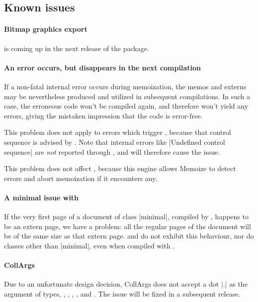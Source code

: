 \documentclass[a4paper,11pt]{article}
\begin{document}
\subsection{Known issues}
\label{sec:known-issues}

\paragraph*{Bitmap graphics export} is coming up in the next release of the
package.


\paragraph{An error occurs, but disappears in the next compilation}
If a non-fatal internal  error occurs during memoization, the memos
and externs may be nevertheless produced and utilized in subsequent
compilations.  In such a case, the erroneous code won't be compiled again, and
therefore won't yield any errors, giving the mistaken impression that the code
is error-free.

This problem does not apply to errors which trigger ,
because that control sequence is advised by .
Note that internal  errors like |Undefined control sequence| are
\emph{not} reported through , and will therefore cause the
issue.

This problem does not affect , because this engine allows
Memoize to detect errors and abort memoization if it encounters any.


\paragraph{A minimal issue with }
If the very first page of a document of class |minimal|, compiled by
, happens to be an extern page, we have a problem: all the
regular pages of the document will be of the same size as that extern page.
 and  do not exhibit this behaviour, nor do
 classes other than |minimal|, even when compiled with
.


\paragraph{CollArgs}

Due to an unfortunate design decision, CollArgs does not accept a dot |.| as
the  argument of types, , ,
, , and .  The issue will be
fixed in a subsequent release.
\end{document}
